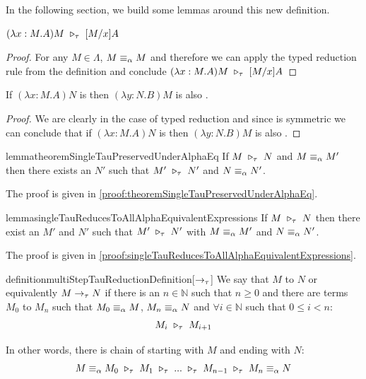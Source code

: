 In the following section, we build some lemmas around this new \osteptaureduction definition.

\begin{lemma}
    $(\lambda x:M.A)M \ \triangleright_{\tau}\  [M/x]A$
\end{lemma}

\begin{proof}
    For any $M \in \Lambda$, $M \equiv_\alpha M$ and therefore we can apply the typed reduction rule from the definition and conclude $(\lambda x:M.A)M \ \triangleright_{\tau}\  [M/x]A$
\end{proof}

\begin{lemma}
    If $(\lambda x:M.A)N$ is \osteptaureducible then $(\lambda y:N.B)M$ is also \osteptaureducible.
\end{lemma}

\begin{proof}
    We are clearly in the case of typed reduction and since \alphaequivalence is symmetric we can conclude that if $(\lambda x:M.A)N$ is \osteptaureducible then $(\lambda y:N.B)M$ is also \osteptaureducible.
\end{proof}

\begin{reusable}{lemma}{theoremSingleTauPreservedUnderAlphaEq}
    If $M \ \triangleright_{\tau}\  N$ and $M \equiv_\alpha M'$ then there exists an $N'$ such that $M' \ \triangleright_{\tau}\  N'$ and $N \equiv_\alpha N'$.
\end{reusable}
The proof is given in \cref{proof:theoremSingleTauPreservedUnderAlphaEq}.

\begin{reusable}{lemma}{singleTauReducesToAllAlphaEquivalentExpressions}
    If $M \ \triangleright_{\tau}\  N$ then there exist an $M'$ and $N'$ such that $M' \ \triangleright_{\tau}\  N'$ with $M \equiv_\alpha M'$ and $N \equiv_\alpha N'$.
\end{reusable}
The proof is given in \cref{proof:singleTauReducesToAllAlphaEquivalentExpressions}.

\begin{restatable}{definition}{multiStepTauReductionDefinition}[\msteptaureduction $\to_{\tau}$]
\label{multiStepTauReductionDefinition}
We say that $M$ \taureduces to $N$ or equivalently $M \to_{\tau} N$ if there is an $n \in \mathbb{N}$ such that $n \geq 0$ and there are terms $M_{0}$ to $M_{n}$ such that $M_{0} \equiv_\alpha M$, $M_{n} \equiv_\alpha N$ and $\forall i \in \mathbb{N}$ such that $0 \leq i < n$:
\[
M_{i} \ \triangleright_{\tau}\  M_{i+1}
\]
\end{restatable}

In other words, there is chain of \osteptaureductions starting with $M$ and ending with $N$:
\[
M \equiv_\alpha M_{0} \ \triangleright_{\tau}\  M_{1} \ \triangleright_{\tau}\  ... \ \triangleright_{\tau}\  M_{n-1} \ \triangleright_{\tau}\  M_{n} \equiv_\alpha N
\]

